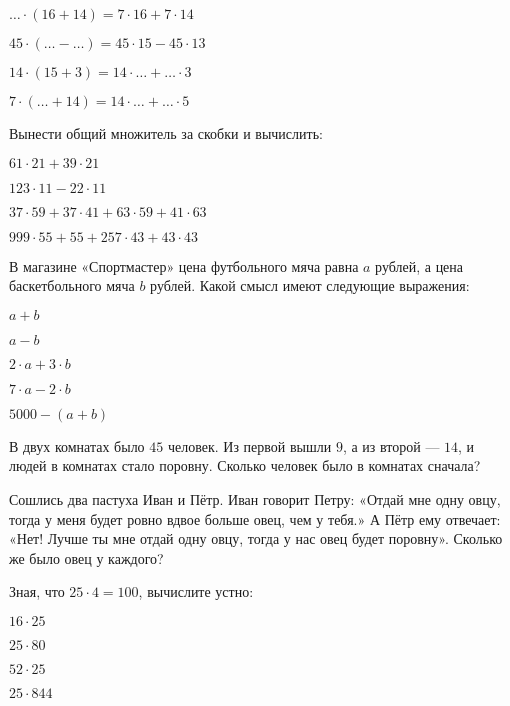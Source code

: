 \begin{class}[number=1]
\begin{listofex}
\begin{enumcols}[itemcolumns=2]
		\item \( {\dots}\cdot(16+14)=7\cdot16+7\cdot14 \)
		\item \( 45\cdot({\dots}-{\dots})=45\cdot15-45\cdot13 \)
		\item \( 14\cdot(15+3)=14\cdot{\dots}+{\dots}\cdot3 \)
		\item \( 7\cdot({\dots}+14)=14\cdot{\dots}+{\dots}\cdot5 \)
	\end{enumcols}
	\item Вынести общий множитель за скобки и вычислить:
	\begin{enumcols}[itemcolumns=2]
		\item \( 61\cdot21+39\cdot21 \)
		\item \( 123\cdot11-22\cdot11 \)
		\item \( 37\cdot59+37\cdot41+63\cdot59+41\cdot63 \)
		\item \( 999\cdot55+55+257\cdot43+43\cdot43 \)
	\end{enumcols}
	\item В магазине «Спортмастер» цена футбольного мяча равна \( a \) рублей, а цена баскетбольного
	мяча \( b \) рублей. Какой смысл имеют следующие выражения:
	\begin{enumcols}[itemcolumns=5]
		\item \( a+b \)
		\item \( a-b \)
		\item \( 2\cdot a + 3\cdot b \)
		\item \( 7\cdot a - 2\cdot b \)
		\item \( 5000 - (a+b) \)
	\end{enumcols}
	\item В двух комнатах было \( 45 \) человек. Из первой вышли \( 9 \), а из второй --- \( 14 \), и людей в комнатах стало поровну. Сколько человек было в комнатах сначала?
	\item Сошлись два пастуха Иван и Пётр. Иван говорит Петру: «Отдай мне одну овцу,
	тогда у меня будет ровно вдвое больше овец, чем у тебя.» А Пётр ему отвечает: «Нет!
	Лучше ты мне отдай одну овцу, тогда у нас овец будет поровну». Сколько же было овец у
	каждого?
	\item Зная, что \( 25\cdot4=100 \), вычислите устно:
	\begin{enumcols}[itemcolumns=4]
		\item \( 16\cdot25 \)
		\item \( 25\cdot80 \)
		\item \( 52\cdot25 \)
		\item \( 25\cdot844 \)

\end{enumcols}
\end{listofex}
\end{class}
